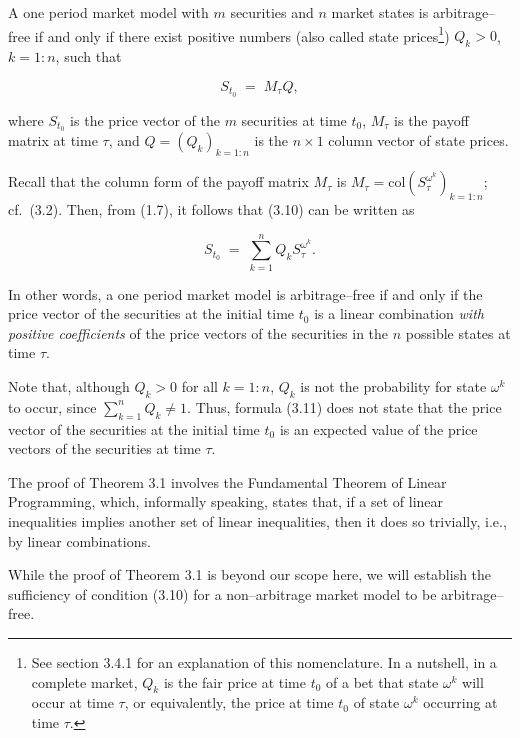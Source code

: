 \begin{theorem}
A one period market model with $m$ securities and $n$ market states is
arbitrage--free if and only if there exist positive numbers (also called
state prices\footnote{See section 3.4.1 for an explanation of this
nomenclature. In a nutshell, in a complete market, $Q_k$ is the fair price
at time $t_0$ of a bet that state $\omega^k$ will occur at time $\tau$, or
equivalently, the price at time $t_0$ of state $\omega^k$ occurring at
time $\tau$.}) $Q_k > 0$, $k = 1:n$, such that

\begin{equation}
S_{t_0} \;=\; M_\tau Q,
\end{equation}

where $S_{t_0}$ is the price vector of the $m$ securities at time $t_0$,
$M_\tau$ is the payoff matrix at time $\tau$, and $Q = (Q_k)_{k=1:n}$ is
the $n \times 1$ column vector of state prices.
\end{theorem}

Recall that the column form of the payoff matrix $M_\tau$ is $M_\tau =
\mathrm{col}\left(S_\tau^{\omega^k}\right)_{k=1:n}$; cf.\ (3.2). Then,
from (1.7), it follows that (3.10) can be written as

\begin{equation}
S_{t_0} \;=\; \sum_{k=1}^n Q_k S_\tau^{\omega^k}.
\end{equation}

In other words, a one period market model is arbitrage--free if and only
if the price vector of the securities at the initial time $t_0$ is a
linear combination \textit{with positive coefficients} of the price
vectors of the securities in the $n$ possible states at time $\tau$.

Note that, although $Q_k > 0$ for all $k = 1:n$, $Q_k$ is not the
probability for state $\omega^k$ to occur, since $\sum_{k=1}^n Q_k \ne
1$. Thus, formula (3.11) does not state that the price vector of the
securities at the initial time $t_0$ is an expected value of the price
vectors of the securities at time $\tau$.

The proof of Theorem 3.1 involves the Fundamental Theorem of Linear
Programming, which, informally speaking, states that, if a set of linear
inequalities implies another set of linear inequalities, then it does so
trivially, i.e., by linear combinations.

While the proof of Theorem 3.1 is beyond our scope here, we will establish
the sufficiency of condition (3.10) for a non--arbitrage market model to
be arbitrage--free.

